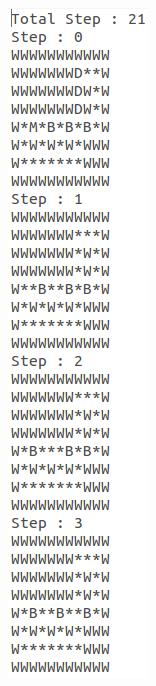 \documentclass[10pt, letter]{article}
\begin{document}
\begin{figure} [h!]
\centering
\begin{subfigure}{.5\textwidth}
  \centering
  \includegraphics[scale = 0.35]{images/sokoban3-ans1}
\end{subfigure}%
\begin{subfigure}{.5\textwidth}
  \centering

\end{subfigure}
\end{figure}
\end{document}
